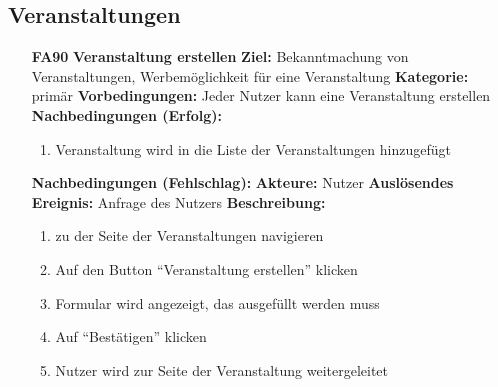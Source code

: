 \documentclass[parskip=full]{scrartcl}
\begin{document}
		\subsection{Veranstaltungen}
		\begin{itemize}[nosep]
			
			\item[\textbf{FA90}]\textbf{Veranstaltung erstellen}
				\newline \textbf{Ziel:} Bekanntmachung von Veranstaltungen, Werbemöglichkeit für eine Veranstaltung
				\newline \textbf{Kategorie:} primär
				\newline \textbf{Vorbedingungen:} Jeder Nutzer kann eine Veranstaltung erstellen
				\newline \textbf{Nachbedingungen (Erfolg):} 
				\begin{enumerate}[nosep]
					\item Veranstaltung wird in die Liste der Veranstaltungen hinzugefügt 
				\end{enumerate}
				\textbf{Nachbedingungen (Fehlschlag):}
				\newline \textbf{Akteure:} Nutzer
				\newline \textbf{Auslösendes Ereignis:} Anfrage des Nutzers
				\newline \textbf{Beschreibung:}
				\begin{enumerate}[nosep]
					\item zu der Seite der Veranstaltungen navigieren
					\item Auf den Button “Veranstaltung erstellen” klicken
					\item Formular wird angezeigt, das ausgefüllt werden muss
					\item Auf “Bestätigen” klicken
					\item Nutzer wird zur Seite der Veranstaltung weitergeleitet\\
				\end{enumerate}
				

\end{itemize}
\end{document}
